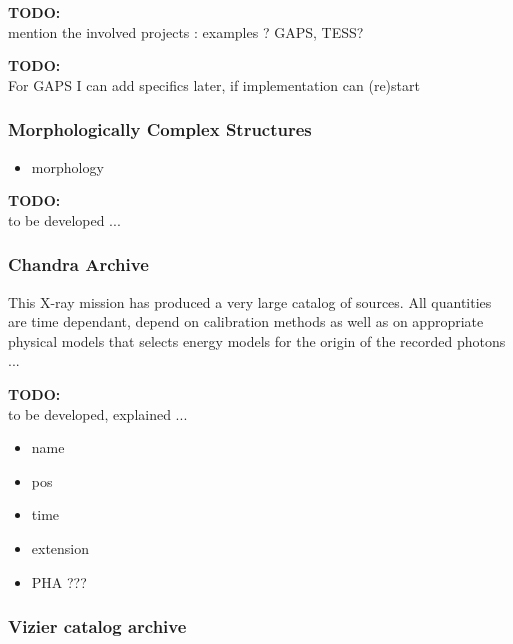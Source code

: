 \documentclass[11pt,a4paper]{ivoa}
\newcommand{\TODO}[1]{%
    \noindent%
    \colorbox{todocolor}{%
            \parbox{0.85\linewidth}{\sffamily \textbf{TODO:}\\
            #1}
    }%
    \vspace{2pt}

}
\begin{document}
\TODO{mention the involved projects : examples ? GAPS, TESS? }
\TODO{For GAPS I can add specifics later, if implementation can
(re)start}

\subsubsection{Morphologically Complex Structures}

\begin{itemize}
    \item morphology
\end{itemize}

\TODO{to be developed ...}

\subsubsection{Chandra Archive}
This X-ray mission has produced a very large catalog of sources. %
All quantities are time dependant, depend on calibration methods as well as on appropriate physical
models that selects energy models for the origin of the recorded photons ...


\TODO{to be developed, explained ...}
\begin{itemize}
    \item name
    \item pos
    \item time
    \item extension
    \item PHA ???
\end{itemize}

\subsubsection{Vizier catalog archive  }
\end{document}
